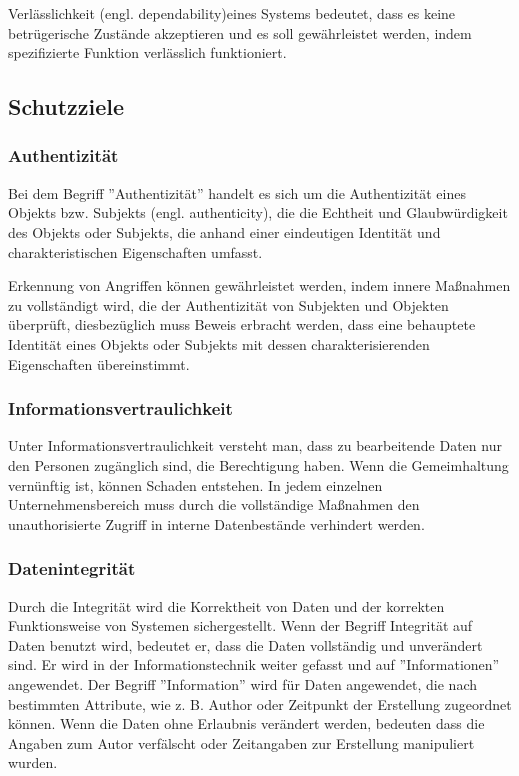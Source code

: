 Verlässlichkeit (engl. dependability)eines Systems bedeutet, dass es keine betrügerische Zustände akzeptieren und es soll gewährleistet werden, indem spezifizierte Funktion verlässlich funktioniert\cite[27]{eckert2013sicherheit}.

\subsection{Schutzziele}

\subsubsection{Authentizität}

Bei dem Begriff ''Authentizität'' handelt es sich um die Authentizität eines Objekts bzw. Subjekts (engl. authenticity), die die Echtheit und Glaubwürdigkeit des Objekts oder Subjekts, die anhand einer eindeutigen Identität und charakteristischen Eigenschaften umfasst\cite[28]{eckert2013sicherheit}.

Erkennung von Angriffen können gewährleistet werden, indem innere Maßnahmen zu vollständigt wird, die der Authentizität von Subjekten und Objekten überprüft\cite[13]{spies1985datenschutz}, diesbezüglich muss Beweis erbracht werden, dass eine behauptete Identität eines Objekts oder Subjekts mit dessen charakterisierenden Eigenschaften übereinstimmt\cite[28]{eckert2013sicherheit}.

\subsubsection{Informationsvertraulichkeit}
Unter Informationsvertraulichkeit versteht man, dass zu bearbeitende Daten nur den Personen zugänglich sind, die Berechtigung haben. Wenn die Gemeimhaltung vernünftig ist, können Schaden entstehen. In jedem einzelnen Unternehmensbereich muss durch die vollständige Maßnahmen den unauthorisierte Zugriff in interne Datenbestände verhindert werden\cite[205]{gora2003handbuch}.

\subsubsection{Datenintegrität}

Durch die Integrität wird die Korrektheit von Daten und der korrekten Funktionsweise von Systemen sichergestellt. Wenn der Begriff Integrität auf Daten benutzt wird, bedeutet er, dass die Daten vollständig und unverändert sind. Er wird in der Informationstechnik weiter gefasst und auf ''Informationen'' angewendet. Der Begriff ''Information'' wird für Daten angewendet, die nach bestimmten Attribute, wie z. B. Author oder Zeitpunkt der Erstellung zugeordnet können. Wenn die Daten ohne Erlaubnis verändert werden, bedeuten dass die Angaben zum Autor verfälscht oder Zeitangaben zur Erstellung manipuliert wurden\cite{dtint2007}.

